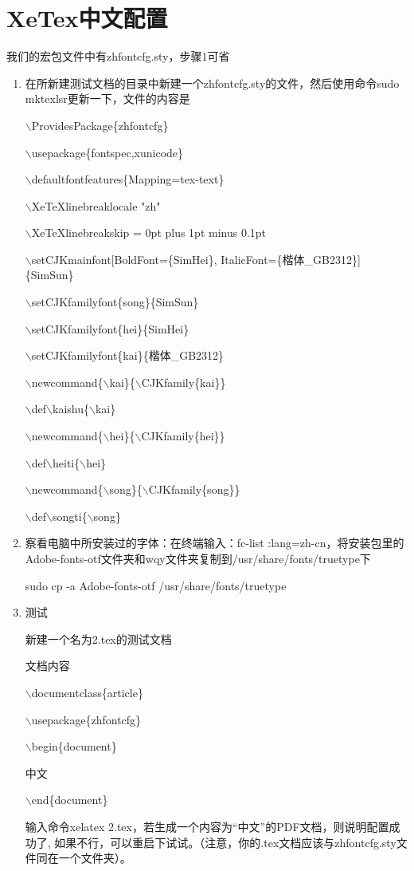 \documentclass[a4paper,12pt]{article}
\begin{document}
\section{XeTex中文配置}

我们的宏包文件中有zhfontcfg.sty，步骤1可省

\begin{enumerate}

\item 在所新建测试文档的目录中新建一个zhfontcfg.sty的文件，然后使用命令sudo mktexlsr更新一下，文件的内容是


$\backslash$ProvidesPackage\{zhfontcfg\}

$\backslash$usepackage\{fontspec,xunicode\}

$\backslash$defaultfontfeatures\{Mapping=tex-text\} %


$\backslash$XeTeXlinebreaklocale "zh"

$\backslash$XeTeXlinebreakskip = 0pt plus 1pt minus 0.1pt

$\backslash$setCJKmainfont[BoldFont=\{SimHei\}, ItalicFont=\{楷体\_GB2312\}]\{SimSun\}

$\backslash$setCJKfamilyfont\{song\}\{SimSun\}

$\backslash$setCJKfamilyfont\{hei\}\{SimHei\}

$\backslash$setCJKfamilyfont\{kai\}\{楷体\_GB2312\}
 


$\backslash$newcommand\{$\backslash$kai\}\{$\backslash$CJKfamily\{kai\}\} 

$\backslash$def$\backslash$kaishu\{$\backslash$kai\}

$\backslash$newcommand\{$\backslash$hei\}\{$\backslash$CJKfamily\{hei\}\} 

$\backslash$def$\backslash$heiti\{$\backslash$hei\}


$\backslash$newcommand\{$\backslash$song\}\{$\backslash$CJKfamily\{song\}\} 

$\backslash$def$\backslash$songti\{$\backslash$song\}

\item 察看电脑中所安装过的字体：在终端输入：fc-list :lang=zh-cn，将安装包里的Adobe-fonts-otf文件夹和wqy文件夹复制到/usr/share/fonts/truetype下

sudo cp -a Adobe-fonts-otf /usr/share/fonts/truetype

\item 测试

新建一个名为2.tex的测试文档

文档内容

$\backslash$documentclass\{article\}

$\backslash$usepackage\{zhfontcfg\}

$\backslash$begin\{document\}

中文

$\backslash$end\{document\}

输入命令xelatex 2.tex，若生成一个内容为“中文”的PDF文档，则说明配置成功了, 如果不行，可以重启下试试。（注意，你的.tex文档应该与zhfontcfg.sty文件同在一个文件夹）。

\end{enumerate}
\end{document}
